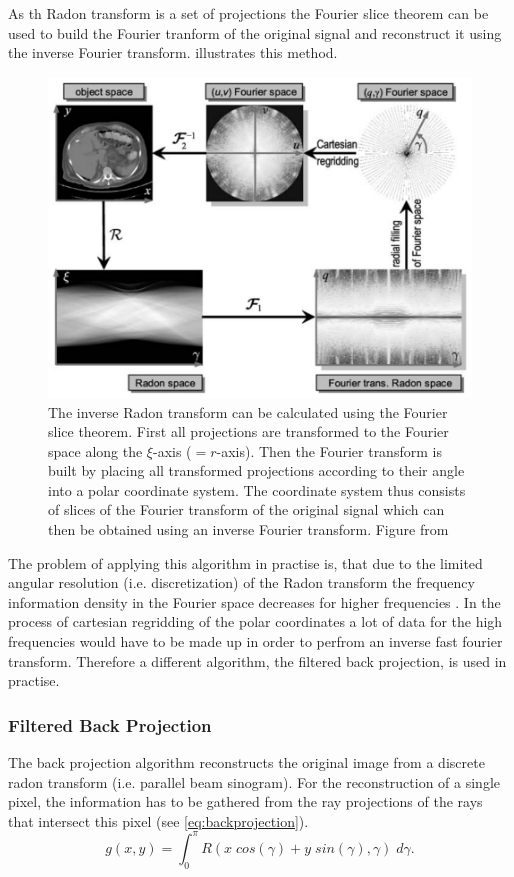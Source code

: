 \documentclass[10pt,journal,compsoc]{IEEEtran}
\begin{document}
As th Radon transform is a set of projections the Fourier slice theorem can be used to build the Fourier tranform of the original signal and reconstruct it using the inverse Fourier transform.
 illustrates this method.
%
\begin{figure}[!h]
\centering
\includegraphics[width=\linewidth]{img/inverseradon.png}
\caption{
The inverse Radon transform can be calculated using the Fourier slice theorem.
First all projections are transformed to the Fourier space along the $\xi$-axis ($=r$-axis).
Then the Fourier transform is built by placing all transformed projections according to their angle into a polar coordinate system.
The coordinate system thus consists of slices of the Fourier transform of the original signal which can then
be obtained using an inverse Fourier transform.
Figure from \cite{Buzug2008_chap5}
}
\label{fig:inverseradon}
\end{figure}
%
The problem of applying this algorithm in practise is, that due to the limited angular resolution (i.e. discretization) of the Radon transform the frequency information density in the Fourier space decreases for higher frequencies \cite{Buzug2008_chap5}.
In the process of cartesian regridding of the polar coordinates a lot of data for the high frequencies would have to be made up in order to perfrom an inverse fast fourier transform.
Therefore a different algorithm, the filtered back projection, is used in practise.

\subsubsection{Filtered Back Projection}\label{sssec:fbp}
The back projection algorithm reconstructs the original image from a discrete radon transform (i.e. parallel beam sinogram).
For the reconstruction of a single pixel, the information has to be gathered from the ray projections of the rays that intersect this pixel (see \cref{eq:backprojection}).
\begin{equation}
\label{eq:backprojection}
g(x,y) = \int_0^\pi R(x\;cos(\gamma)+y\;sin(\gamma),\gamma)\;d\gamma. 
\end{equation}
\end{document}
